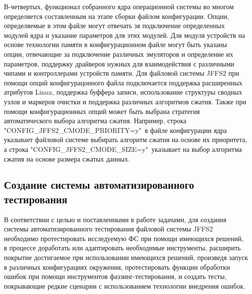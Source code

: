 В-четвертых, функционал собранного ядра операционной системы во многом определяется составленным на этапе сборки файлом конфигурации. Опции, определяемые в этом файле могут отвечать зя подключение определенных модулей ядра и указание параметров для этих модулей. Для модуля устройств на основе технологии памяти в конфигурационном файле могут быть указаны опции, отвечающие за подключение различных эмуляторов и определение их параметров, поддержку драйверов нужных для взаимодействия с различными чипами и контроллерами устройств памяти. Для файловой системы JFFS2 при помощи опций конфигурацонного файла подключается поддержка расширенных атрибутов Linux, поддержка буффера записи, использование структуры сводных узлов и маркеров очистки и поддержка различных алгоритмов сжатия. Также при помощи конфигурационных опций может быть выбрана стратегия автоматического выбора алгоритма сжатия. Например, строка "CONFIG\_JFFS2\_CMODE\_PRIORITY=y"\ в файле конфигурации ядра указывает файловой системе выбирать алгоритм сжатия на основе их приоритета, а строка "CONFIG\_JFFS2\_CMODE\_SIZE=y"\ указывает на выбор алгоритма сжатия на основе размера сжатых данных.

\subsection{Создание системы автоматизированного тестирования}

В соответствии с целью и поставленными в работе задачами, для создания системы автоматизированного тестирования файловой системы JFFS2 необходимо протестировать исследуемую ФС при помощи имеющихся решений, в процессе доработать или адаптировать необходимые инструменты, расширить покрытие достигаемое при использовании имеющихся решений, произведя запуск в различных конфигурациях окружения, протестировать функции обработки ошибок при помощи инструментов фаззинг-тестирования, и создать тесты, покрывающие редкие сценарии с использованием технологии внедрения ошибок.

\newpage
